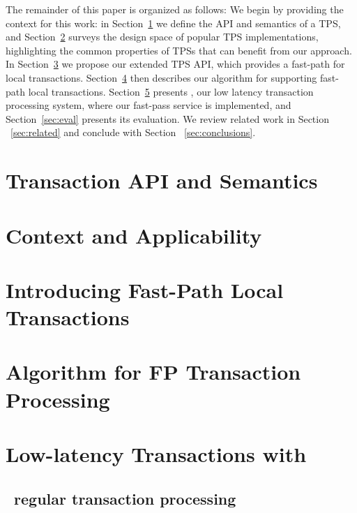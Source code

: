 \documentclass[preprint]{sigplanconf-eurosys}
\begin{document}
The remainder of this paper is organized as follows:
We begin by providing the context for this work:   in Section~\ref{sec:api} we define the  API and semantics of a TPS, 
and    Section~\ref{sec:context} surveys  the design space of popular TPS implementations, 
highlighting the common properties of TPSs that can benefit from our approach. 
In Section~\ref{sec:new-api} we propose our extended TPS API, which provides a fast-path for local transactions. 
Section~\ref{sec:alg} then describes our algorithm for supporting fast-path local transactions.  
Section~\ref{sec:impl} presents \sys, our low latency transaction processing system, where our fast-pass service is implemented, 
and Section~\ref{sec:eval} presents its evaluation. 
We review related work in Section ~\ref{sec:related} and conclude with Section ~\ref{sec:conclusions}.

\section{Transaction API and Semantics} \label{sec:api}


\section{Context and Applicability} \label{sec:context}


\section{Introducing Fast-Path Local Transactions} \label{sec:new-api}


\section{Algorithm for FP Transaction Processing} \label{sec:alg}



\section{Low-latency Transactions with \sys} \label{sec:impl}

\subsection{\sys\ regular transaction processing}
\end{document}
